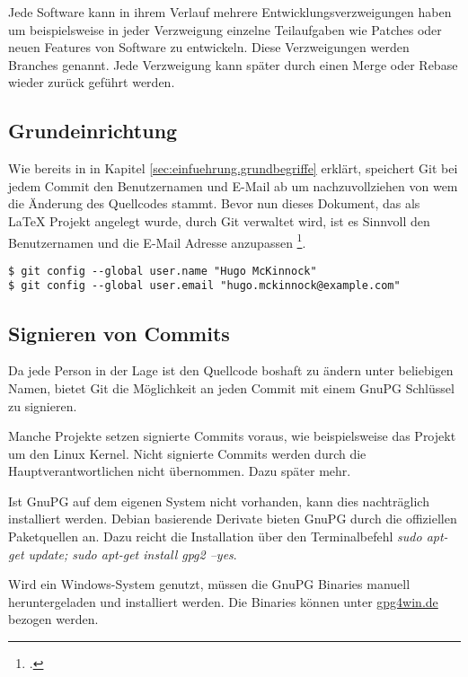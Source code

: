 Jede Software kann in ihrem Verlauf mehrere Entwicklungsverzweigungen haben um beispielsweise in jeder Verzweigung einzelne Teilaufgaben wie Patches oder neuen Features von Software zu entwickeln. Diese Verzweigungen werden Branches genannt. Jede Verzweigung kann später durch einen Merge oder Rebase wieder zurück geführt werden.

\subsection{Grundeinrichtung}
\label{sec:einfuehrung.git}
Wie bereits in in Kapitel \ref{sec:einfuehrung.grundbegriffe} erklärt, speichert Git bei jedem Commit den Benutzernamen und E-Mail ab um nachzuvollziehen von wem die Änderung des Quellcodes stammt. Bevor nun dieses Dokument, das als \LaTeX{} Projekt angelegt wurde, durch Git verwaltet wird, ist es Sinnvoll den Benutzernamen und die E-Mail Adresse anzupassen \footcite{git-1.6-your-identity}.

\begin{verbatim}
$ git config --global user.name "Hugo McKinnock"
$ git config --global user.email "hugo.mckinnock@example.com"
\end{verbatim}

\subsection{Signieren von Commits}
\label{sec:einfuehrung.sign-commits}
Da jede Person in der Lage ist den Quellcode boshaft zu ändern unter beliebigen Namen, bietet Git die Möglichkeit an jeden Commit mit einem GnuPG Schlüssel zu signieren.

\begin{INFO}
  Manche Projekte setzen signierte Commits voraus, wie beispielsweise das Projekt um den Linux Kernel. Nicht signierte Commits werden durch die Hauptverantwortlichen nicht übernommen. Dazu später mehr.
\end{INFO}

Ist GnuPG auf dem eigenen System nicht vorhanden, kann dies nachträglich installiert werden. Debian basierende Derivate  bieten GnuPG durch die offiziellen Paketquellen an. Dazu reicht die Installation über den Terminalbefehl \textit{sudo apt-get update; sudo apt-get install gpg2 --yes}.

Wird ein Windows-System genutzt, müssen die GnuPG Binaries manuell heruntergeladen und installiert werden. Die Binaries können unter \href{https://www.gpg4win.de}{gpg4win.de} bezogen werden.

